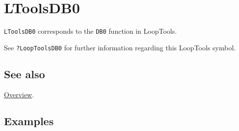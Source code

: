 \documentclass[../FeynHelpersManual.tex]{subfiles}
\begin{document}
\hypertarget{ltoolsdb0}{
\section{LToolsDB0}\label{ltoolsdb0}}

\texttt{LToolsDB0} corresponds to the \texttt{DB0} function in
LoopTools.

See \texttt{?LoopTools\textasciigrave DB0} for further information
regarding this LoopTools symbol.

\subsection{See also}

\hyperlink{toc}{Overview}.

\subsection{Examples}
\end{document}
